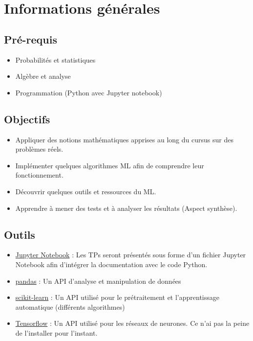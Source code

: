 \documentclass[11pt, a4paper]{article}
\begin{document}
\section{Informations générales}

\begin{minipage}{0.49\textwidth}

\subsection{Pré-requis}

\begin{itemize}
	\item Probabilités et statistiques
	\item Algèbre et analyse 
	\item Programmation (Python avec Jupyter notebook)
\end{itemize}
\end{minipage}
\begin{minipage}{0.49\textwidth}
\subsection{Objectifs}

\begin{itemize}
	\item Appliquer des notions mathématiques apprises au long du cursus sur des problèmes réels.
	\item Implémenter quelques algorithmes ML afin de comprendre leur fonctionnement.
	\item Découvrir quelques outils et ressources du ML.
	\item Apprendre à mener des tests et à analyser les résultats (Aspect synthèse).
\end{itemize}

\end{minipage}

\subsection{Outils}

\begin{itemize}
	\item \href{https://jupyter.org}{Jupyter Notebook} : Les TPs seront présentés sous forme d'un fichier Jupyter Notebook afin d'intégrer la documentation avec le code Python.
	\item \href{https://pandas.pydata.org/}{pandas} : Un API d'analyse et manipulation de données
	\item \href{https://scikit-learn.org/}{scikit-learn} : Un API utilisé pour le prétraitement et l'apprentissage automatique (différents algorithmes)
	\item \href{https://www.tensorflow.org/}{Tensorflow} : Un API utilisé pour les réseaux de neurones. Ce n'ai pas la peine de l'installer pour l'instant.
\end{itemize}
\end{document}
